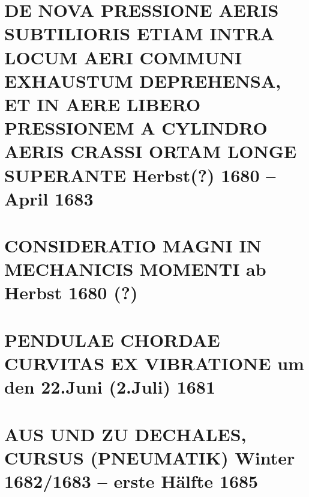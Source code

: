 \documentclass[%
fontsize=10pt,
]{scrbook}
\DeclareRobustCommand{\bracks}[1]{%
\textup{\lbrack}#1\textup{\rbrack}}
\begin{document}
\chapter[tocentry={De nova pressione aeris subtilioris etiam intra locum aeri communi exhaustum deprehensa, et in aere libero pressionem a cylindro aeris crassi ortam longe superante
\enskip\bracks{%
Herbst\;(?) 1680 -- April 1683%
}},
head={De nova pressione aeris subtilioris}]%
{\MakeUppercase{De nova pressione aeris subtilioris etiam intra locum aeri communi exhaustum deprehensa, et in aere libero pressionem a cylindro aeris crassi ortam longe superante}
\newline\bracks{%
Herbst\;(?) 1680 -- April 1683%
}%
}
\label{60205}




\chapter[tocentry={Consideratio magni in mechanicis momenti %
\enskip\bracks{%
ab Herbst 1680 (?)%
}}, %
head={Consideratio magni in mechanicis momenti%
}]%
{\MakeUppercase{Consideratio magni in mechanicis momenti} %
\newline\bracks{%
ab Herbst 1680 (?)%
}}%
\label{55813-C}




\chapter[tocentry={Pendulae chordae curvitas ex vibratione %
\enskip \lbrack um 22.\;Juni 1681\rbrack}, %
head={Pendulae chordae curvitas ex vibratione%
}]%
{\MakeUppercase{Pendulae chordae curvitas ex vibratione} %
\newline\lbrack um den 22.\;Juni (2.\;Juli) 1681\rbrack} %
\label{60234}




\chapter[tocentry={Aus und zu Dechales, Cursus (Pneumatik) %
\enskip \bracks{Winter 1682/1683 -- erste Hälfte 1685}},
head={Aus und zu Dechales, Cursus (Pneumatik)}]%
{\MakeUppercase{Aus und zu Dechales, Cursus (Pneumatik)}
\newline \bracks{Winter 1682/1683 -- erste Hälfte 1685}}
\label{41182-1}%
%
\end{document}
